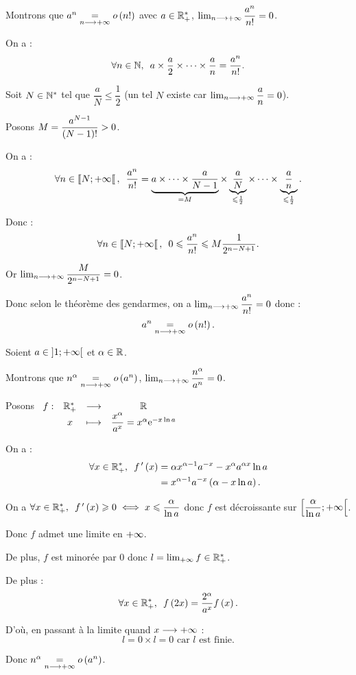 \begin{dem}
Montrons que \(a^n\underset{n\longrightarrow+\infty}{=}o\left(n!\right)\) avec \(a\in\mathbb{R}_+^*\), \cad \(\lim_{n\longrightarrow+\infty}\dfrac{a^n}{n!}=0\).

On a : \[\quantifs{\forall n\in\N}a\times\dfrac{a}{2}\times\dots\times\dfrac{a}{n}=\dfrac{a^n}{n!}.\]

Soit \(N\in\mathbb{N}^*\) tel que \(\dfrac{a}{N}\leq\dfrac{1}{2}\) (un tel \(N\) existe car \(\lim_{n\longrightarrow+\infty}\dfrac{a}{n}=0\)).

Posons \(M=\dfrac{a^{N-1}}{\left(N-1\right)!}>0\).

On a : \[\quantifs{\forall n\in\interventierie{N}{\pinf}}\dfrac{a^n}{n!}=\underbrace{a\times\dots\times\dfrac{a}{N-1}}_{=M}\times\underbrace{\dfrac{a}{N}}_{\leq\frac{1}{2}}\times\dots\times\underbrace{\dfrac{a}{n}}_{\leq\frac{1}{2}}.\]

Donc : \[\quantifs{\forall n\in\interventierie{N}{\pinf}}0\leq\dfrac{a^n}{n!}\leq M\dfrac{1}{2^{n-N+1}}.\]

Or \(\lim_{n\longrightarrow+\infty}\dfrac{M}{2^{n-N+1}}=0\).

Donc selon le théorème des gendarmes, on a \(\lim_{n\longrightarrow+\infty}\dfrac{a^n}{n!}=0\) donc : \[a^n\underset{n\longrightarrow+\infty}{=}o\left(n!\right).\]
\end{dem}

\begin{dem}
Soient \(a\in\left]1;+\infty\right[\) et \(\alpha\in\mathbb{R}\).

Montrons que \(n^\alpha\underset{n\longrightarrow+\infty}{=}o\left(a^n\right)\), \cad \(\lim_{n\longrightarrow+\infty}\dfrac{n^\alpha}{a^n}=0\).

Posons \(\begin{array}[t]{cccc}f : & \mathbb{R}_+^* & \longrightarrow & \mathbb{R} \\ & x & \longmapsto & \dfrac{x^\alpha}{a^x}=x^\alpha\mathrm{e}^{-x\ln a}\end{array}\)

On a : \[\begin{aligned}
\quantifs{\forall x\in\Rps}f\prim\paren{x}&=\alpha x^{\alpha-1}a^{-x}-x^\alpha a^{\alpha x}\ln a \\
&=x^{\alpha-1}a^{-x}\paren{\alpha-x\ln a}.
\end{aligned}\]

On a \(\quantifs{\forall x\in\Rps}f\prim\paren{x}\geq0\ssi x\leq\dfrac{\alpha}{\ln a}\) donc \(f\) est décroissante sur \(\left[\dfrac{\alpha}{\ln a};+\infty\right[\).

Donc \(f\) admet une limite en \(+\infty\).

De plus, \(f\) est minorée par \(0\) donc \(l=\lim_{+\infty}f\in\mathbb{R}_+^*\).

De plus : \[\quantifs{\forall x\in\Rps}f\paren{2x}=\dfrac{2^\alpha}{a^x}f\paren{x}.\]

D'où, en passant à la limite quand \(x\longrightarrow+\infty\) : \[l=0\times l=0\text{ car }l\text{ est finie}.\]

Donc \(n^\alpha\underset{n\longrightarrow+\infty}{=}o\left(a^n\right)\).
\end{dem}

